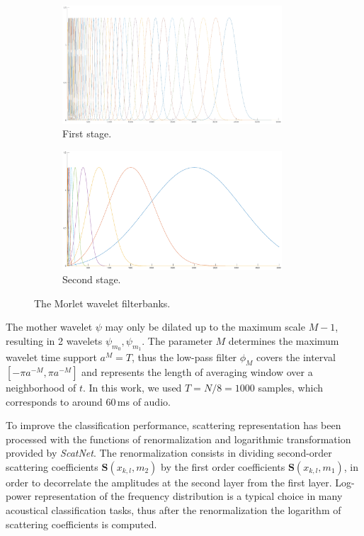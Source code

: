 \begin{figure}[h]
	\centering
	\begin{subfigure}[b]{0.45\columnwidth}
		\includegraphics[width=0.9\textwidth]{img/scatter_filters_1.eps}
		\caption{First stage.}
	\end{subfigure}
	\begin{subfigure}[b]{0.45\columnwidth}
		\includegraphics[width=0.9\textwidth]{img/scatter_filters_2.eps}
		\caption{Second stage.}
	\end{subfigure}
	\caption{The Morlet wavelet filterbanks.}\label{fig:filters}
\end{figure}

The mother wavelet $\psi$ may only be dilated up to the maximum scale $M-1$, resulting in 2 wavelets $\psi_{m_0}, \psi_{m_1}$. The parameter $M$ determines the maximum wavelet time support $a^M=T$,
thus the low-pass filter $\phi_M$ covers the interval $[-\pi a^{-M},\pi a^{-M}]$ and represents the length of averaging window over a neighborhood of $t$. 
In this work, we used $T=N/8=1000$ samples, which corresponds to around 60\,ms of audio. 

To improve the classification performance, scattering representation has been processed with the functions of renormalization and logarithmic transformation provided by \textit{ScatNet}. The renormalization consists in dividing second-order scattering coefficients $\mathbf{S}(x_{k,l}, m_2)$ by the first order coefficients $\mathbf{S}(x_{k,l}, m_1)$, in order to decorrelate the amplitudes at the second layer from the first layer. Log-power representation of the frequency distribution is a typical choice in many acoustical classification tasks, thus after the renormalization the logarithm of scattering coefficients is computed. 

